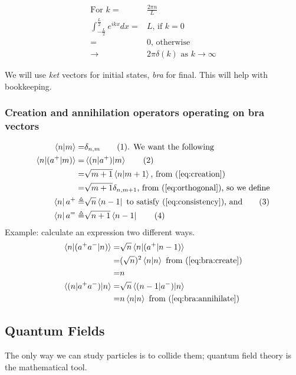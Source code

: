 \documentclass[]{article}
\newcommand\numberthis{\addtocounter{equation}{1}\tag{\theequation}}
\begin{document}
\begin{align*}
	\text{For } k =& \frac{2 \pi n}{L}\\
	\int_{-\frac{L}{2}}^{\frac{L}{2}} e^{ikx} dx =& L \text{, if $k =0$}\\
	=& 0 \text{, otherwise}\\
	\rightarrow& 2 \pi \delta(k) \text{ as $k \rightarrow \infty$}
\end{align*}

We will use \emph{ket} vectors for initial states, \emph{bra} for final. This will help with bookkeeping.

\subsubsection{Creation and annihilation operators operating on bra vectors}

\begin{align*}
	\braket{n|m} =& \delta_{n,m}\numberthis \label{eq:orthogonal} \text{. We want the following}\\
	\braket{n|(a^+|m)} =& \braket{(n|a^+)|m}  \numberthis \label{eq:consistency}\\
	=& \sqrt{m+1} \braket{n|m+1} \text{, from (\ref{eq:creation})}\\
	=& \sqrt{m+1} \delta_{n,m+1} \text{, from (\ref{eq:orthogonal})} \text{, so we define}\\
	\bra{n} a^+ \triangleq & \sqrt{n} \bra{n-1} \text{ to satisfy (\ref{eq:consistency}), and} \numberthis \label{eq:bra:create}\\
	\bra{n} a^= \triangleq & \sqrt{n+1} \bra{n-1} \numberthis \label{eq:bra:annihilate}
\end{align*}
Example: calculate an expression two different ways.
\begin{align*}
	\braket{n|(a^+a^-|n)} =& \sqrt{n}\braket{n|(a^+|n-1)}\\
	=& (\sqrt{n})^2 \braket{n|n} \text{ from (\ref{eq:bra:create})}\\
	=& n\\
	\braket{(n|a^+a^-)|n} =& \sqrt{n} \braket{(n-1|a^-)|n}\\
	=& n \braket{n|n} \text{ from (\ref{eq:bra:annihilate})}
\end{align*}

\subsection{Quantum Fields}

The only way we can study particles is to collide them; quantum field theory is the mathematical tool.
\end{document}
